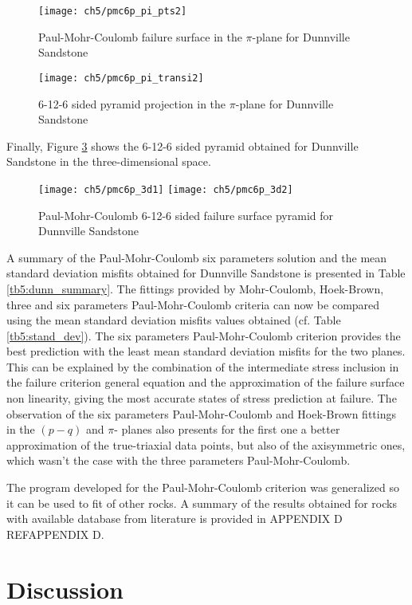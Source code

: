 \begin{figure} [p]
    \centering
    \texttt{[image: ch5/pmc6p\_pi\_pts2]}
    \caption{Paul-Mohr-Coulomb failure surface in the $\pi$-plane for Dunnville Sandstone}
    \label{fig5:pmc6p_pi_plane}
\end{figure}
\begin{figure} [p]
    \centering
    \texttt{[image: ch5/pmc6p\_pi\_transi2]}
    \caption{6-12-6 sided pyramid projection in the $\pi$-plane for Dunnville Sandstone}
    \label{fig5:pmc6p_pi_transi}
\end{figure}

Finally, Figure \ref{fig5:pmc6p_3d} shows the 6-12-6 sided pyramid obtained for Dunnville Sandstone in the three-dimensional space. 

\begin{figure}
    \centering
    \texttt{[image: ch5/pmc6p\_3d1]}
    \texttt{[image: ch5/pmc6p\_3d2]}
    \caption{Paul-Mohr-Coulomb 6-12-6 sided failure surface pyramid for Dunnville Sandstone}
    \label{fig5:pmc6p_3d}
\end{figure}

A summary of the Paul-Mohr-Coulomb six parameters solution and the mean standard deviation misfits obtained for Dunnville Sandstone is presented in Table \ref{tb5:dunn_summary}. The fittings provided by Mohr-Coulomb, Hoek-Brown, three and six parameters Paul-Mohr-Coulomb criteria can now be compared using the mean standard deviation misfits values obtained (cf. Table \ref{tb5:stand_dev}). 
The six parameters Paul-Mohr-Coulomb criterion provides the best prediction with the least mean standard deviation misfits for the two planes. This can be explained by the combination of the intermediate stress inclusion in the failure criterion general equation and the approximation of the failure surface non linearity, giving the most accurate states of stress prediction at failure. The observation of the six parameters Paul-Mohr-Coulomb and Hoek-Brown fittings in the $(p-q)$ and $\pi$- planes also presents for the first one a better approximation of the true-triaxial data points, but also of the axisymmetric ones, which wasn't the case with the three parameters Paul-Mohr-Coulomb. 

The program developed for the Paul-Mohr-Coulomb criterion was generalized so it can be used to fit of other rocks. A summary of the results obtained for rocks with available database from literature is provided in APPENDIX D REF{APPENDIX D}.

\section{Discussion}

